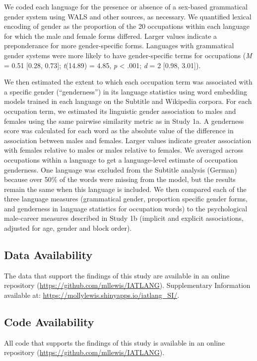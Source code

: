 \documentclass[9pt,twocolumn]{pnas-new}
\begin{document}
We coded each language for the presence or absence of a sex-based grammatical gender system using WALS \cite{wals} and other sources, as necessary. We quantified lexical encoding of gender as the proportion of the 20 occupations within each language for which the male and female forms differed. Larger values indicate a preponderance for more gender-specific forms.  Languages with grammatical gender systems were more likely to have gender-specific terms for occupations
(\emph{M} = 0.51 {[}0.28, 0.73{]}; \emph{t}(14.89) = 4.85, \emph{p} \textless{} .001; \emph{d} = 2 {[}0.98, 3.01{]}). 

We then estimated the extent to which each occupation term was associated with a specific gender (``genderness'')  in its language statistics using word
embedding models trained in each language on the Subtitle and Wikipedia
corpora. For each occupation term, we estimated its linguistic gender association to males and females using the same pairwise similarity metric as in Study 1a. A genderness score was calculated for each word as the absolute value of the difference in association between males and females.  Larger values indicate greater association with females relative to males or males relative to females. We averaged across occupations within a language to get a
language-level estimate of occupation genderness. One language was excluded from the Subtitle analysis (German) because over 50\% of the words were missing from the model, but the results remain the same when this language is included.  We then compared each of the three
language measures (grammatical gender, proportion specific gender forms,
and genderness in language statistics for occupation words) to the
psychological male-career measures described in Study 1b (implicit and
explicit associations, adjusted for age, gender and block order).


\subsection*{Data Availability}

The data that support the findings of this study are available in an online repository (\url{https://github.com/mllewis/IATLANG}). Supplementary Information available at:  \url{https://mollylewis.shinyapps.io/iatlang_SI/}. 

\subsection*{Code Availability}
All code that supports the findings of this study is available in an online repository (\url{https://github.com/mllewis/IATLANG}).
\end{document}

